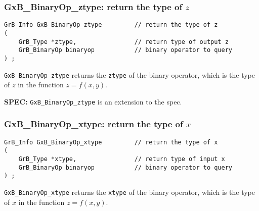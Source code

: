 \documentclass[12pt]{article}
\begin{document}

\subsubsection{{\sf GxB\_BinaryOp\_ztype:} return the type of $z$}
\label{binaryop_ztype}

\begin{mdframed}[userdefinedwidth=6in]
{\footnotesize
\begin{verbatim}
GrB_Info GxB_BinaryOp_ztype         // return the type of z
(
    GrB_Type *ztype,                // return type of output z
    GrB_BinaryOp binaryop           // binary operator to query
) ;
\end{verbatim}
} \end{mdframed}

\verb'GxB_BinaryOp_ztype'
returns the \verb'ztype' of the binary operator, which is the
type of $z$ in the function $z=f(x,y)$.

\begin{spec}
{\bf SPEC:} \verb'GxB_BinaryOp_ztype' is an extension to the spec.
\end{spec}

\subsubsection{{\sf GxB\_BinaryOp\_xtype:} return the type of $x$}
\label{binaryop_xtype}

\begin{mdframed}[userdefinedwidth=6in]
{\footnotesize
\begin{verbatim}
GrB_Info GxB_BinaryOp_xtype         // return the type of x
(
    GrB_Type *xtype,                // return type of input x
    GrB_BinaryOp binaryop           // binary operator to query
) ;
\end{verbatim}
}\end{mdframed}

\verb'GxB_BinaryOp_xtype'
returns the \verb'xtype' of the binary operator, which is the
type of $x$ in the function $z=f(x,y)$.
\end{document}
